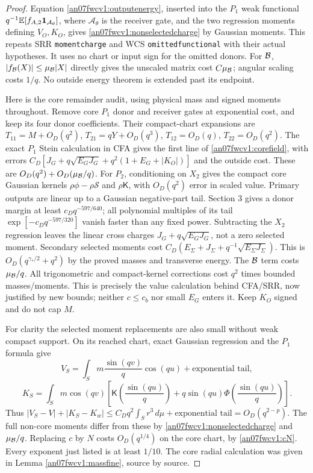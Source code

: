 \documentclass[11pt]{article}
\numberwithin{equation}{section}
\newcommand{\E}{\mathbb E}\newcommand{\dd}{\,d}
\newcommand{\Kfun}{\mathsf K}\newcommand{\Ffun}{\mathsf F}
\begin{document}
\begin{proof}
Equation \eqref{an07fwcv1:outputenergy}, inserted into the
\(P_1\) weak functional \(q^{-1}\E[f_{A,2}\one_{\mathcal A_\theta}]\),
where \(\mathcal A_\theta\) is the receiver gate,
and the two regression moments defining \(V_O,K_O\), gives
\eqref{an07fwcv1:nonselectedcharge} by Gaussian moments.
This repeats SRR \texttt{momentcharge} and WCS
\texttt{omittedfunctional} with their actual hypotheses.
It uses no chart or input sign for the omitted donors.
For \(\mathcal B\), \(|f_\mathcal B(X)|\le\mu_\mathcal B|X|\) directly gives
the unscaled matrix cost \(C\mu_\mathcal B\); angular scaling costs
\(1/q\). No outside energy theorem is extended past its endpoint.

Here is the core remainder audit, using physical mass and signed
moments throughout. Remove core \(P_1\) donor and receiver gates
at exponential cost, and keep its four donor coefficients.
Their compact-chart expansions are
\(T_{11}=M+O_D(q^2)\), \(T_{21}=qY+O_D(q^3)\),
\(T_{12}=O_D(q)\), \(T_{22}=O_D(q^2)\).
The exact \(P_1\) Stein calculation in CFA gives the first
line of \eqref{an07fwcv1:corefield}, with errors
\(C_D[J_G+q\sqrt{E_GJ_G}+q^2(1+E_G+|K_O|)]\)
and the outside cost. These are \(O_D(q^2)+O_D(\mu_\mathcal B/q)\).
For \(P_2\), conditioning on \(X_2\) gives the compact core
Gaussian kernels \(\rho\phi-\rho\mathcal S\) and
\(\rho\Kfun\), with \(O_D(q^2)\) error in scaled value.
Primary outputs are linear up to a Gaussian negative-part tail.
Section 3 gives a donor margin at least \(c_Dq^{-597/640}\);
all polynomial multiples of its tail
\(\exp[-c_Dq^{-597/320}]\) vanish faster than any fixed power.
Subtracting the \(X_2\) regression leaves the linear cross
charges \(J_G+q\sqrt{E_GJ_G}\), not a zero selected moment.
Secondary selected moments cost
\(C_D(E_\Sigma+J_\Sigma+q^{-1}\sqrt{E_\Sigma J_\Sigma})\).
This is \(O_D(q^{\gamma_*/2}+q^2)\) by the proved masses
and transverse energy. The \(\mathcal B\) term costs \(\mu_\mathcal B/q\).
All trigonometric and compact-kernel corrections cost
\(q^2\) times bounded masses/moments. This is precisely the
value calculation behind CFA/SRR, now justified by new bounds;
neither \(c\le c_b\) nor small \(E_G\) enters it. Keep
\(K_O\) signed and do not cap \(M\).

For clarity the selected moment replacements are also small
without weak compact support. On its reached chart, exact Gaussian
regression and the \(P_1\) formula give
\[
 V_S=\int_Sm\frac{\sin(qv)}q\cos(qu)+\text{exponential tail},
\]
\[
 K_S=\int_Sm\cos(qv)
 \left[\Kfun\!\left(\frac{\sin(qu)}q\right)
       +q\sin(qu)\Phi\!\left(\frac{\sin(qu)}q\right)\right].
\]
Thus \(|V_S-V|+|K_S-K_w|\le C_Dq^2\int_S r^3\dd\mu
 +\text{exponential tail}=O_D(q^{2-p})\).
The full non-core moments differ from these by
\eqref{an07fwcv1:nonselectedcharge} and \(\mu_\mathcal B/q\).
Replacing \(c\) by \(N\) costs \(O_D(q^{1/4})\) on the core
chart, by \eqref{an07fwcv1:cN}. Every exponent just listed is
at least \(1/10\). The core radial calculation was given in
Lemma \ref{an07fwcv1:massfine}, source by source.


\end{proof}
\end{document}
